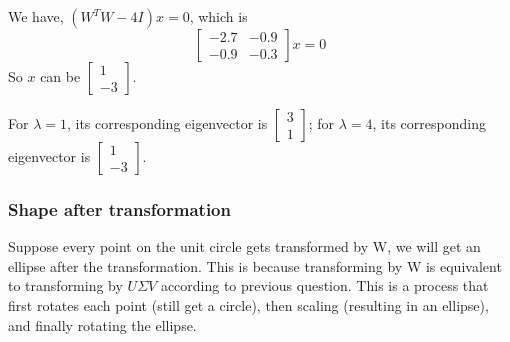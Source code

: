 \documentclass{article}
\begin{document}
We have, $(W^T W - 4I)x = 0$, which is
\[
\begin{bmatrix} -2.7 & -0.9 \\ -0.9 & -0.3 \end{bmatrix} x = 0
\]
So $x$ can be $\begin{bmatrix} 1 \\ -3 \end{bmatrix}$.

For $\lambda = 1$, its corresponding eigenvector is $\begin{bmatrix} 3 \\ 1 \end{bmatrix}$; for $\lambda = 4$, its corresponding eigenvector is $\begin{bmatrix} 1 \\ -3 \end{bmatrix}$. 
\subsubsection*{Shape after transformation}
Suppose every point on the unit circle gets transformed by W, we will get an ellipse after the transformation. This is because transforming by W is equivalent to transforming by $U \Sigma V$ according to previous question. This is a process that first rotates each point (still get a circle), then scaling (resulting in an ellipse), and finally rotating the ellipse.
\end{document}

